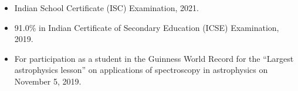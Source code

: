 \documentclass[10pt,a4paper,ragged2e,withhyper]{altacv}
\begin{document}
\begin{paracol}{2}
            
        
                \begin{itemize}
                    \item Indian School Certificate (ISC) Examination, 2021.
                \end{itemize}
            \divider
            
                \begin{itemize}
                    \item 91.0\% in Indian Certificate of Secondary Education (ICSE) Examination, 2019.
                \end{itemize}
        
                \begin{itemize}
                    \item For participation as a student in the Guinness World Record for the ``Largest \\astrophysics lesson'' on applications of spectroscopy in astrophysics on \\November 5, 2019.
                \end{itemize}
            \divider


\end{paracol}
\end{document}
